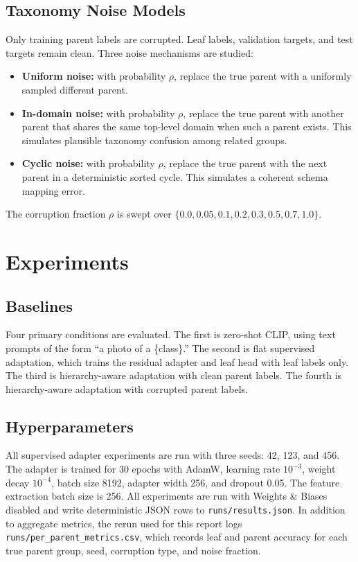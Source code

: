 \documentclass[runningheads]{llncs}
\begin{document}
\subsection{Taxonomy Noise Models}
Only training parent labels are corrupted. Leaf labels, validation targets, and
test targets remain clean. Three noise mechanisms are studied:
\begin{itemize}
\item \textbf{Uniform noise:} with probability $\rho$, replace the true parent
with a uniformly sampled different parent.
\item \textbf{In-domain noise:} with probability $\rho$, replace the true
parent with another parent that shares the same top-level domain when such a
parent exists. This simulates plausible taxonomy confusion among related
groups.
\item \textbf{Cyclic noise:} with probability $\rho$, replace the true parent
with the next parent in a deterministic sorted cycle. This simulates a coherent
schema mapping error.
\end{itemize}
The corruption fraction $\rho$ is swept over
$\{0.0,0.05,0.1,0.2,0.3,0.5,0.7,1.0\}$.

\section{Experiments}
\subsection{Baselines}
Four primary conditions are evaluated. The first is zero-shot CLIP, using text
prompts of the form ``a photo of a \{class\}.'' The second is flat supervised
adaptation, which trains the residual adapter and leaf head with leaf labels
only. The third is hierarchy-aware adaptation with clean parent labels. The
fourth is hierarchy-aware adaptation with corrupted parent labels.

\subsection{Hyperparameters}
All supervised adapter experiments are run with three seeds: 42, 123, and 456.
The adapter is trained for 30 epochs with AdamW, learning rate $10^{-3}$,
weight decay $10^{-4}$, batch size 8192, adapter width 256, and dropout 0.05.
The feature extraction batch size is 256. All experiments are run with
Weights \& Biases disabled and write deterministic JSON rows to
\texttt{runs/results.json}. In addition to aggregate metrics, the rerun used
for this report logs \texttt{runs/per\_parent\_metrics.csv}, which records
leaf and parent accuracy for each true parent group, seed, corruption type, and
noise fraction.
\end{document}
